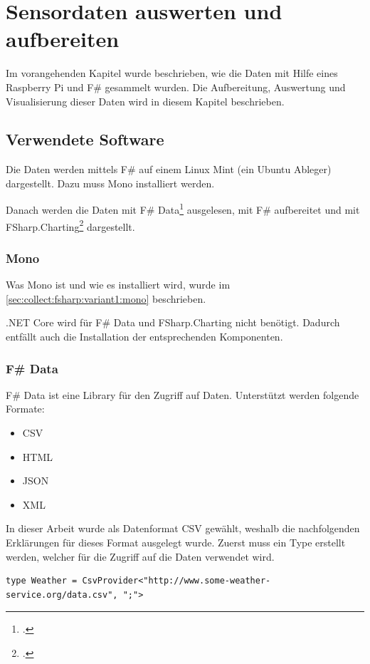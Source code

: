 
\chapter{Sensordaten auswerten und aufbereiten}\label{chap:AnalyseReporting}
Im vorangehenden Kapitel wurde beschrieben, wie die Daten mit Hilfe eines Raspberry Pi und F\# gesammelt wurden. Die Aufbereitung, Auswertung und Visualisierung dieser Daten wird in diesem Kapitel beschrieben.


\section{Verwendete Software}
\label{sec:display:software}
Die Daten werden mittels F\# auf einem Linux Mint (ein Ubuntu Ableger) dargestellt. Dazu muss Mono installiert werden. 

Danach werden die Daten mit F\# Data\footcite{FShaprp_Data_2016-06-17} ausgelesen, mit F\# aufbereitet und mit FSharp.Charting\footcite{FSharp_Charting_2016-06-17} dargestellt.


\subsection{Mono}
Was Mono ist und wie es installiert wird, wurde im \cref{sec:collect:fsharp:variant1:mono}  beschrieben.

.NET Core wird für F\# Data und FSharp.Charting nicht benötigt. Dadurch entfällt auch die Installation der entsprechenden Komponenten.

\subsection{F\# Data}
\label{sec:display:software:fsharpdata}
F\# Data ist eine Library für den Zugriff auf Daten. Unterstützt werden folgende Formate:
\begin{itemize}
\item CSV
\item HTML
\item JSON
\item XML
\end{itemize}

In dieser Arbeit wurde als Datenformat CSV gewählt, weshalb die nachfolgenden Erklärungen für dieses Format ausgelegt wurde.
Zuerst muss ein Type erstellt werden, welcher für die Zugriff auf die Daten verwendet wird.
\begin{lstlisting}
type Weather = CsvProvider<"http://www.some-weather-service.org/data.csv", ";">
\end{lstlisting}

